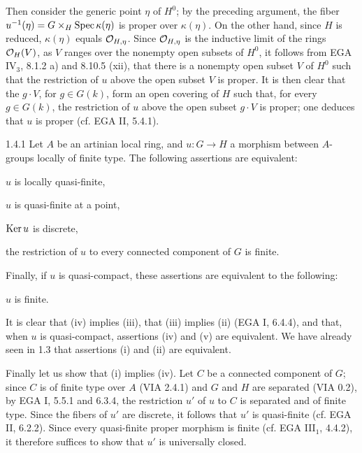 Then consider the generic point $\eta$ of $H^0$; by the preceding argument, the fiber $u^{-1}(\eta)=G\times_H\operatorname{Spec}\kappa(\eta)$ is proper over $\kappa(\eta)$. On the other hand, since $H$ is reduced, $\kappa(\eta)$ equals $\mathcal{O}_{H,\eta}$. Since $\mathcal{O}_{H,\eta}$ is the inductive limit of the rings $\mathcal{O}_H(V)$, as $V$ ranges over the nonempty open subsets of $H^0$, it follows from EGA IV$_3$, 8.1.2 a) and 8.10.5 (xii), that there is a nonempty open subset $V$ of $H^0$ such that the restriction of $u$ above the open subset $V$ is proper. It is then clear that the $g\cdot V$, for $g\in G(k)$, form an open covering of $H$ such that, for every $g\in G(k)$, the restriction of $u$ above the open subset $g\cdot V$ is proper; one deduces that $u$ is proper (cf. EGA II, 5.4.1).
\begin{corollary}{1.4.1}\label{VIB.1.4.1}
Let $A$ be an artinian local ring, and $u:G\to H$ a morphism between $A$-groups locally of finite type. The following assertions are equivalent:
\begin{enumeratei}
\item $u$ is locally quasi-finite,
\item $u$ is quasi-finite at a point,
\item $\operatorname{Ker} u$ is discrete,
\item the restriction of $u$ to every connected component of $G$ is finite.
\end{enumeratei}
Finally, if $u$ is quasi-compact, these assertions are equivalent to the following:
\begin{enumeratei}
\setcounter{enumi}{4}
\item $u$ is finite.
\end{enumeratei}
\end{corollary}
It is clear that (iv) implies (iii), that (iii) implies (ii) (EGA I, 6.4.4), and that, when $u$ is quasi-compact, assertions (iv) and (v) are equivalent. We have already seen in 1.3 that assertions (i) and (ii) are equivalent.

Finally let us show that (i) implies (iv). Let $C$ be a connected component of $G$; since $C$ is of finite type over $A$ (VIA 2.4.1) and $G$ and $H$ are separated (VIA 0.2), by EGA I, 5.5.1 and 6.3.4, the restriction $u'$ of $u$ to $C$ is separated and of finite type. Since the fibers of $u'$ are discrete, it follows that $u'$ is quasi-finite (cf. EGA II, 6.2.2). Since every quasi-finite proper morphism is finite (cf. EGA III$_1$, 4.4.2), it therefore suffices to show that $u'$ is universally closed.

